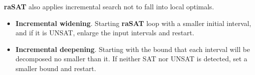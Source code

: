 \documentclass[runningheads,a4paper,oribibl]{llncs}
\newcommand{\suppress}[1]{} %
\begin{document}
\suppress{
ICP is robust for larger degrees, but the number of boxes (products of intervals) to explore 
exponentially explodes when variables increase. 
Thus, design of strategies for selecting variables to decompose and boxes to explore is crucial 
for efficiency. Our strategy design is, 
\begin{itemize}
\item a box with more possibility to be SAT is selected to explore, which is estimated by 
several heuristic measures, called {\em SAT likelihood}, 
and the number of unsolved atomic polynomial constraints, and
\item a more influential variable is selected for multiple test cases and decomposition, 
which is estimated by {\em sensitivity}. 
\end{itemize} 
}
{\bf raSAT} also applies incremental search not to fall into local optimals. 
\begin{itemize}
\item {\bf Incremental widening}. 
Starting {\bf raSAT} loop with a smaller initial interval, and if it is UNSAT, enlarge the input intervals
and restart. 
\item {\bf Incremental deepening}. 
Starting with the bound that each interval will be decomposed no smaller than it. 
If neither SAT nor UNSAT is detected, set a smaller bound and restart. 
\end{itemize} 

\end{document}

